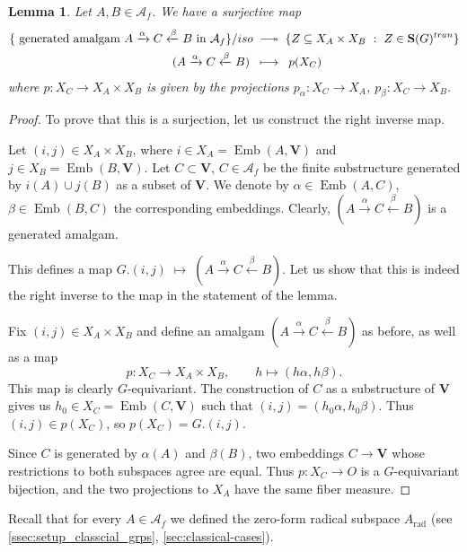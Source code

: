 \documentclass[11pt,a4paper]{amsart}
\theoremstyle{plain}%
\newtheorem{lemma}{Lemma}[subsection]
\theoremstyle{definition}
\theoremstyle{remark}
\newcommand{\V}{\mathbf{V}}
\newcommand{\Emb}{\operatorname{Emb}}
\newcommand{\rmrad}{\mathrm{rad}}
\newcommand{\Set}[1]{\mathbf{S}(#1)}
\newcommand{\longtwoheadrightarrow}{\relbar\joinrel\twoheadrightarrow}
\begin{document}
\begin{lemma}\label{lem:amalgam-orbits}
Let $A, B \in \mathcal{A}_f$. We have a surjective map
\begin{align*}
    \{\text{ generated amalgam } A\xrightarrow{\alpha} C\xleftarrow{\beta}B \text{ in } \mathcal{A}_f\}/iso\;&\longtwoheadrightarrow\; \{Z \subseteq X_A \times X_B~:~ Z\in \Set{G}^{tran}\} \\
    (A\xrightarrow{\alpha} C\xleftarrow{\beta}B) \;\; &\longmapsto \;\; p(X_C)
\end{align*}
where $p:X_C\to X_A\times X_B$ is given by the projections $p_{\alpha}:X_C\to X_A$, $p_{\beta}:X_C\to X_B$.

\end{lemma}


\begin{proof}
To prove that this is a surjection, let us construct the right inverse map.

Let $(i,j)\in X_A\times X_B$, where $i\in X_A=\Emb(A, \V)$ and $j\in X_B=\Emb(B, \V)$.  Let $C\subset\mathbf V$, $C\in \mathcal{A}_f$ be the finite substructure generated by $i(A)\cup j(B)$ as a subset of $\V$. We denote by $\alpha\in \Emb(A, C)$, $ \beta\in \Emb(B, C)$ the corresponding embeddings. Clearly, $(A\xrightarrow{\alpha} C\xleftarrow{\beta}B)$ is a generated amalgam.

This defines a map $G.(i,j) \;\longmapsto\; (A\xrightarrow{\alpha} C\xleftarrow{\beta}B)$. Let us show that this is indeed the right inverse to the map in the statement of the lemma. 

Fix $(i,j)\in X_A\times X_B$ and define an amalgam $(A\xrightarrow{\alpha} C\xleftarrow{\beta}B)$ as before, as well as a map 
\[
 p:X_C\longrightarrow X_A\times X_B,
 \qquad h\longmapsto(h\alpha,h\beta).
\]
This map is clearly $G$-equivariant. The construction of $C$ as a substructure of $\V$ gives us $h_0\in X_C=\Emb(C, \V)$ such that $(i,j)=(h_0\alpha,h_0\beta)$. Thus $(i, j)\in p(X_C)$, so $p(X_C)=G.(i,j) $.

Since $C$ is generated by $\alpha(A)$ and $\beta(B)$, two embeddings $C\to\mathbf V$ whose restrictions to both subspaces agree are equal. Thus $p:X_C\to O$ is a $G$-equivariant bijection, and the two projections to $X_A$ have the same fiber measure.

\end{proof}




Recall that for every $ A\in \mathcal{A}_f$ we defined the zero-form radical subspace $A_{\rmrad}$ (see \cref{ssec:setup_classcial_grps}, \cref{sec:classical-cases}).
\end{document}
